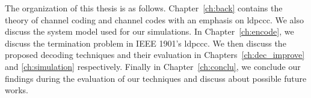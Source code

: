 The organization of this thesis is as follows. Chapter~\ref{ch:back} contains the theory of channel coding and channel codes with an emphasis on \gls{ldpccc}. We also discuss the system model used for our simulations. In Chapter~\ref{ch:encode}, we discuss the termination problem in IEEE 1901's \gls{ldpccc}. We then discuss the proposed decoding techniques and their evaluation in Chapters~\ref{ch:dec_improve} and \ref{ch:simulation} respectively. Finally in Chapter~\ref{ch:conclu}, we conclude our findings during the evaluation of our techniques and discuss about possible future works.